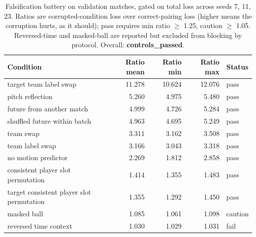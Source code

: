 \begin{table}[t]
  \centering
  \small
  \begin{tabular}{lrrrl}
    \toprule
    Condition & Ratio mean & Ratio min & Ratio max & Status \\
    \midrule
    target team label swap & 11.278 & 10.624 & 12.076 & pass \\
    pitch reflection & 5.260 & 4.975 & 5.480 & pass \\
    future from another match & 4.999 & 4.726 & 5.284 & pass \\
    shuffled future within batch & 4.963 & 4.695 & 5.249 & pass \\
    team swap & 3.311 & 3.162 & 3.508 & pass \\
    team label swap & 3.166 & 3.043 & 3.318 & pass \\
    no motion predictor & 2.269 & 1.812 & 2.858 & pass \\
    consistent player slot permutation & 1.414 & 1.355 & 1.483 & pass \\
    target consistent player slot permutation & 1.355 & 1.292 & 1.450 & pass \\
    masked ball & 1.085 & 1.061 & 1.098 & caution \\
    reversed time context & 1.030 & 1.029 & 1.031 & fail \\
    \bottomrule
  \end{tabular}
  \caption{Falsification battery on validation matches, gated on total loss across seeds 7, 11, 23. Ratios are corrupted-condition loss over correct-pairing loss (higher means the corruption hurts, as it should); pass requires min ratio $\geq$ 1.25, caution $\geq$ 1.05. Reversed-time and masked-ball are reported but excluded from blocking by protocol. Overall: \textbf{controls\_passed}.}
  \label{tab:falsification}
\end{table}
